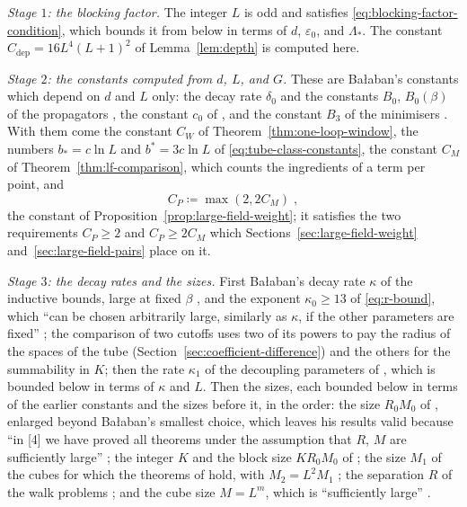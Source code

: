 \documentclass[11pt]{preprint}
\numberwithin{equation}{section}
\theoremstyle{definition}
\theoremstyle{remark}
\theoremstyle{plain}
\begin{document}
\emph{Stage $1$: the blocking factor.} The integer $L$ is odd and satisfies \eqref{eq:blocking-factor-condition}, which bounds it from below in terms of $d$, $\varepsilon_0$, and $\Lambda_*$. The constant $C_{\mathrm{dep}} = 16L^4(L + 1)^2$ of Lemma~\ref{lem:depth} is computed here.

\emph{Stage $2$: the constants computed from $d$, $L$, and $G$.} These are Ba{\l}aban's constants which depend on $d$ and $L$ only: the decay rate $\delta_0$ and the constants $B_0$, $B_0(\beta)$ of the propagators \cite[Theorem~3.1, (3.42), (3.43), p.~397]{BalabanPBG}, the constant $c_0$ of \cite[(2.58)]{BalabanPRT2}, and the constant $B_3$ of the minimisers \cite[Theorem~1, p.~279]{BalabanVAR}. With them come the constant $C_W$ of Theorem~\ref{thm:one-loop-window}, the numbers $b_* = c\ln L$ and $b^* = 3c\ln L$ of \eqref{eq:tube-class-constants}, the constant $C_M$ of Theorem~\ref{thm:lf-comparison}, which counts the ingredients of a term per point, and
\begin{equation}\label{eq:history-constant}
    C_P \coloneqq \max(2, 2C_M)\;,
\end{equation}
the constant of Proposition~\ref{prop:large-field-weight}; it satisfies the two requirements $C_P \geq 2$ and $C_P \geq 2C_M$ which Sections~\ref{sec:large-field-weight} and~\ref{sec:large-field-pairs} place on it.

\emph{Stage $3$: the decay rates and the sizes.} First Ba{\l}aban's decay rate $\kappa$ of the inductive bounds, large at fixed $\beta$ \cite[p.~260]{BalabanCRE}, and the exponent $\kappa_0 \geq 13$ of \eqref{eq:r-bound}, which ``can be chosen arbitrarily large, similarly as $\kappa$, if the other parameters are fixed'' \cite[p.~260]{BalabanCRE}; the comparison of two cutoffs uses two of its powers to pay the radius of the spaces of the tube (Section~\ref{sec:coefficient-difference}) and the others for the summability in $K$; then the rate $\kappa_1$ of the decoupling parameters of \cite{BalabanRG2}, which is bounded below in terms of $\kappa$ and $L$. Then the sizes, each bounded below in terms of the earlier constants and the sizes before it, in the order: the size $R_0M_0$ of \cite[p.~408]{BalabanPBG}, enlarged beyond Ba{\l}aban's smallest choice, which leaves his results valid because ``in [4] we have proved all theorems under the assumption that $R$, $M$ are sufficiently large'' \cite[p.~408]{BalabanPBG}; the integer $K$ and the block size $KR_0M_0$ of \cite{BalabanPBG}; the size $M_1$ of the cubes for which the theorems of \cite{BalabanPBG,BalabanVAR,BalabanREG} hold, with $M_2 = L^2M_1$ \cite[p.~245]{BalabanCRE}; the separation $R$ of the walk problems \cite[(2.2)]{BalabanPRT2}; and the cube size $M = L^m$, which is ``sufficiently large'' \cite[p.~245]{BalabanCRE}.
\end{document}
